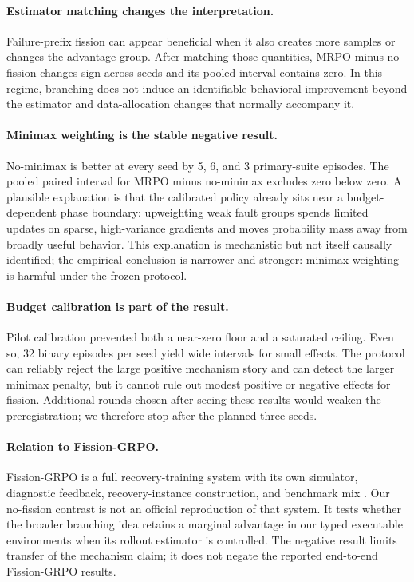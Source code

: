 \documentclass[10pt]{article}
\newcommand{\method}{\textsc{MRPO}}
\begin{document}
\paragraph{Estimator matching changes the interpretation.}
Failure-prefix fission can appear beneficial when it also creates more
samples or changes the advantage group.  After matching those quantities,
\method{} minus no-fission changes sign across seeds and its pooled interval
contains zero.  In this regime, branching does not induce an identifiable
behavioral improvement beyond the estimator and data-allocation changes that
normally accompany it.

\paragraph{Minimax weighting is the stable negative result.}
No-minimax is better at every seed by 5, 6, and 3 primary-suite episodes.  The
pooled paired interval for \method{} minus no-minimax excludes zero below
zero.  A plausible explanation is that the calibrated policy already sits
near a budget-dependent phase boundary: upweighting weak fault groups spends
limited updates on sparse, high-variance gradients and moves probability
mass away from broadly useful behavior.  This explanation is mechanistic but
not itself causally identified; the empirical conclusion is narrower and
stronger: minimax weighting is harmful under the frozen protocol.

\paragraph{Budget calibration is part of the result.}
Pilot calibration prevented both a near-zero floor and a saturated ceiling.
Even so, 32 binary episodes per seed yield wide intervals for small effects.
The protocol can reliably reject the large positive mechanism story and can
detect the larger minimax penalty, but it cannot rule out modest positive or
negative effects for fission.  Additional rounds chosen after seeing these
results would weaken the preregistration; we therefore stop after the planned
three seeds.

\paragraph{Relation to Fission-GRPO.}
Fission-GRPO is a full recovery-training system with its own simulator,
diagnostic feedback, recovery-instance construction, and benchmark mix
\citep{zhang2026fissiongrpo}.  Our no-fission contrast is not an official
reproduction of that system.  It tests whether the broader branching idea
retains a marginal advantage in our typed executable environments when its
rollout estimator is controlled.  The negative result limits transfer of the
mechanism claim; it does not negate the reported end-to-end Fission-GRPO
results.
\end{document}
